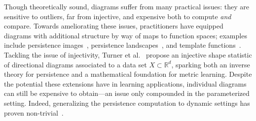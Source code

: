 \documentclass[10pt]{article}
\numberwithin{equation}{section}
\newcommand{\+}{%
	\raisebox{0.18ex}{\scaleobj{0.55}{+}}
}
\theoremstyle{definition}
\theoremstyle{definition}
\newcommand\numberthis{\addtocounter{equation}{1}\tag{\theequation}}
\begin{document}
Though theoretically sound, diagrams suffer from many practical issues: they are sensitive to outliers, far from injective, and expensive both to compute \emph{and} compare. 
Towards ameliorating these issues, practitioners have equipped diagrams with additional structure by way of maps to function spaces; examples include persistence images~\cite{adams2017persistence}, persistence landscapes~\cite{bubenik2015statistical}, and template functions~\cite{perea2022approximating}. 
Tackling the issue of injectivity, Turner et al.~\cite{turner2014persistent} propose an injective shape statistic of directional diagrams associated to a data set $X \subset \mathbb{R}^d$,  
sparking both an inverse theory for persistence and a mathematical foundation for metric learning.  
Despite the potential these extensions have in learning applications,
individual diagrams can still be expensive to obtain---an issue only compounded in the parameterized setting. Indeed, generalizing the persistence computation to dynamic settings has proven non-trivial~\cite{piekenbrock2021move}.
 
\end{document}
